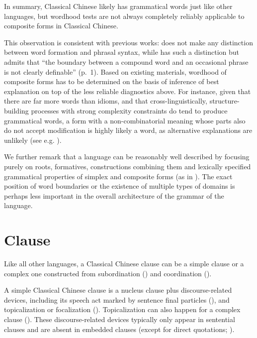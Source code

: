 \documentclass[UTF8, a4paper, oneside, scheme=plain, 12pt]{ctexrep}
\newcommand*{\citepage}[1]{p.~{#1}}
\begin{document}
In summary, Classical Chinese likely has grammatical words just like other languages,
but wordhood tests are not always completely reliably applicable to composite forms in Classical Chinese.

This observation is consistent with previous works:
\citet{pulleyblank1995outline} does not make any distinction between word formation and phrasal syntax,
while \citet{unger2019grammar} has such a distinction but admits that ``the boundary between a compound word and an occasional phrase is not clearly definable'' (\citepage{1}).
Based on existing materials, wordhood of composite forms has to be determined
on the basis of inference of best explanation on top of the less reliable diagnostics above.
For instance, given that there are far more words than idioms,
and that cross-linguistically, structure-building processes with strong complexity constraints do tend to produce grammatical words,
a form with a non-combinatorial meaning whose parts also do not accept modification is highly likely a word,
as alternative explanations are unlikely
(see e.g. ).

We further remark that a language can be reasonably well described by focusing purely on roots, formatives, constructions combining them and lexically specified grammatical properties of simplex and composite forms (as in ).
The exact position of word boundaries or the existence of multiple types of domains is perhaps less important in the overall architecture of the grammar of the language.

\section{Clause}\label{sec:grammatical.clause}

Like all other languages, a Classical Chinese clause can be a simple clause
or a complex one constructed from subordination ()
and coordination ().

A simple Classical Chinese clause is a nucleus clause plus discourse-related devices,
including its speech act marked by sentence final particles (), 
and topicalization or focalization ().
Topicalization can also happen for a complex clause ().
These discourse-related devices typically only appear in sentential clauses and are absent in embedded clauses (except for direct quotations; ). 
\end{document}
